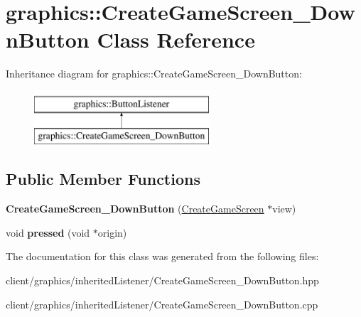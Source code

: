 \hypertarget{classgraphics_1_1_create_game_screen___down_button}{\section{graphics\-:\-:Create\-Game\-Screen\-\_\-\-Down\-Button Class Reference}
\label{classgraphics_1_1_create_game_screen___down_button}
}
Inheritance diagram for graphics\-:\-:Create\-Game\-Screen\-\_\-\-Down\-Button\-:\begin{figure}[H]
\begin{center}
\leavevmode
\includegraphics[height=2.000000cm]{classgraphics_1_1_create_game_screen___down_button}
\end{center}
\end{figure}
\subsection*{Public Member Functions}
\begin{DoxyCompactItemize}
\item 
\hypertarget{classgraphics_1_1_create_game_screen___down_button_a978e61e60dd0fd92590e8a4f235adf29}{{\bfseries Create\-Game\-Screen\-\_\-\-Down\-Button} (\hyperlink{classgraphics_1_1_create_game_screen}{Create\-Game\-Screen} $\ast$view)}\label{classgraphics_1_1_create_game_screen___down_button_a978e61e60dd0fd92590e8a4f235adf29}

\item 
\hypertarget{classgraphics_1_1_create_game_screen___down_button_aa88f113c5ee6cc4b32a698e19b9cdfcb}{void {\bfseries pressed} (void $\ast$origin)}\label{classgraphics_1_1_create_game_screen___down_button_aa88f113c5ee6cc4b32a698e19b9cdfcb}

\end{DoxyCompactItemize}


The documentation for this class was generated from the following files\-:\begin{DoxyCompactItemize}
\item 
client/graphics/inherited\-Listener/Create\-Game\-Screen\-\_\-\-Down\-Button.\-hpp\item 
client/graphics/inherited\-Listener/Create\-Game\-Screen\-\_\-\-Down\-Button.\-cpp\end{DoxyCompactItemize}
